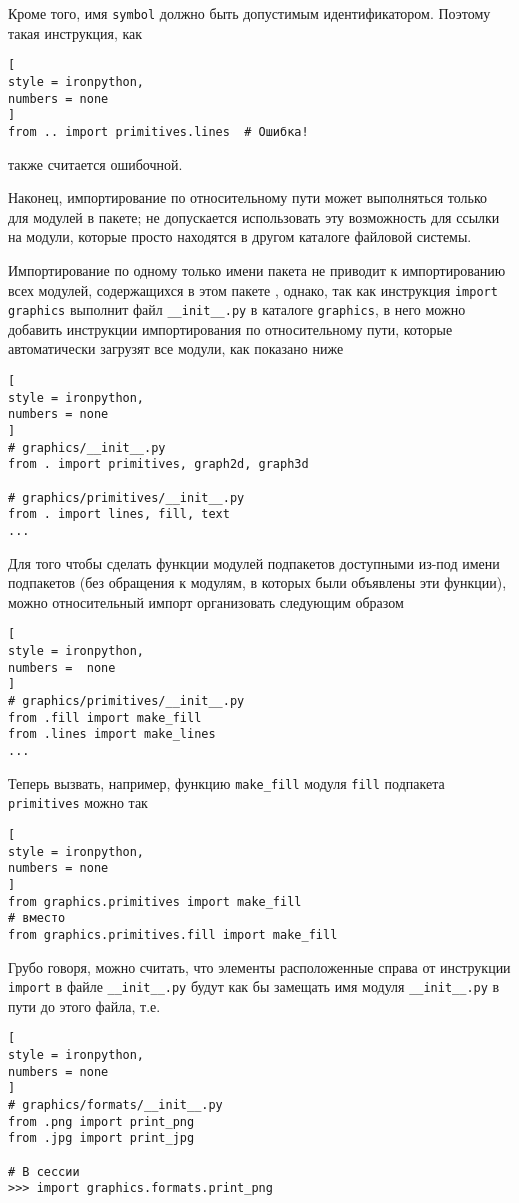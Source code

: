 \documentclass[%
	11pt,
	a4paper,
	utf8,
		]{article}
\begin{document}
Кроме того, имя \texttt{symbol} должно быть допустимым идентификатором. Поэтому такая инструкция, как 
\begin{lstlisting}[
style = ironpython,
numbers = none
]
from .. import primitives.lines  # Ошибка!
\end{lstlisting}
также считается ошибочной.

Наконец, импортирование по относительному пути может выполняться только для модулей в пакете; не допускается использовать эту возможность для ссылки на модули, которые просто находятся в другом каталоге файловой системы.

Импортирование по одному только имени пакета не приводит к импортированию всех модулей, содержащихся в этом пакете \cite[]{beazley:python-2010}, однако, так как инструкция \texttt{import graphics} выполнит файл \verb|__init__.py| в каталоге \texttt{graphics}, в него можно добавить инструкции импортирования по относительному пути, которые автоматически загрузят все модули, как показано ниже
\begin{lstlisting}[
style = ironpython,
numbers = none
]
# graphics/__init__.py
from . import primitives, graph2d, graph3d

# graphics/primitives/__init__.py
from . import lines, fill, text
...
\end{lstlisting}

Для того чтобы сделать функции модулей подпакетов доступными из-под имени подпакетов (без обращения к модулям, в которых были объявлены эти функции), можно относительный импорт организовать следующим образом
\begin{lstlisting}[
style = ironpython,
numbers =  none
]
# graphics/primitives/__init__.py
from .fill import make_fill
from .lines import make_lines
...
\end{lstlisting}

Теперь вызвать, например, функцию \texttt{make\_fill} модуля \texttt{fill} подпакета \texttt{primitives} можно так
\begin{lstlisting}[
style = ironpython,
numbers = none
]
from graphics.primitives import make_fill
# вместо
from graphics.primitives.fill import make_fill
\end{lstlisting}

Грубо говоря, можно считать, что элементы расположенные справа от инструкции \texttt{import} в файле \verb|__init__.py| будут как бы замещать имя модуля \verb|__init__.py| в пути до этого файла, т.е.
\begin{lstlisting}[
style = ironpython,
numbers = none
]
# graphics/formats/__init__.py
from .png import print_png
from .jpg import print_jpg

# В сессии
>>> import graphics.formats.print_png
\end{lstlisting}
\end{document}
